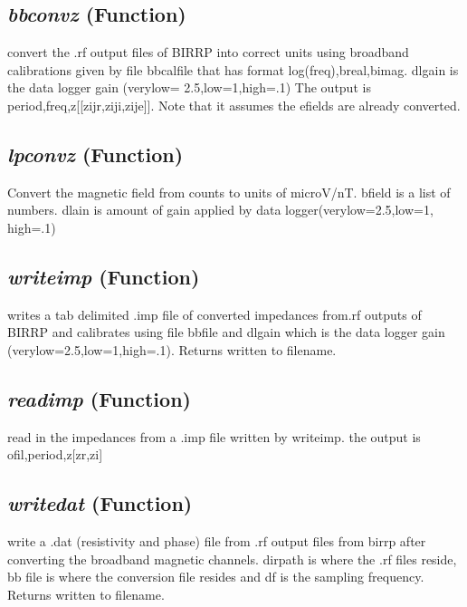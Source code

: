 \subsection{\textit{bbconvz} (Function)}
\label{ssec:processing.birrptools.bbconvz}

convert the .rf output files of BIRRP 
    into correct units using broadband calibrations given by file bbcalfile that
    has format log(freq),breal,bimag. dlgain is the data logger gain (verylow=
    2.5,low=1,high=.1) The output is period,freq,z[[zijr,ziji,zije]].
    Note that it assumes the efields are already converted.

\subsection{\textit{lpconvz} (Function)}
\label{ssec:processing.birrptools.lpconvz}

Convert the magnetic field from counts to units of microV/nT.
    bfield is a list of numbers. dlain is amount of gain applied
    by data logger(verylow=2.5,low=1, high=.1)

\subsection{\textit{writeimp} (Function)}
\label{ssec:processing.birrptools.writeimp}

writes a tab delimited .imp 
    file of converted impedances from.rf outputs of BIRRP and calibrates using 
    file bbfile and dlgain which is the data logger gain 
    (verylow=2.5,low=1,high=.1). Returns written to filename.


\subsection{\textit{readimp} (Function)}
\label{ssec:processing.birrptools.readimp}

read in the impedances from a .imp file written 
    by writeimp. the output is ofil,period,z[zr,zi]

\subsection{\textit{writedat} (Function)}
\label{ssec:processing.birrptools.writedat}

write a .dat 
    (resistivity and phase) file from .rf output 
    files from birrp after converting the broadband magnetic channels. dirpath
    is where the .rf files reside, bb file is where the conversion file
    resides and df is the sampling frequency. Returns written to filename.


